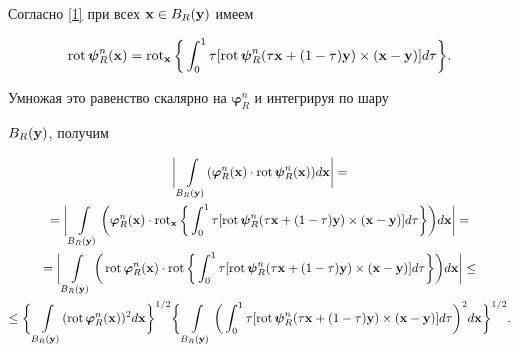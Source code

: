 \begin{pf}
Согласно \eqref{1} при всех $\bold{x}\in B_R(\bold{y})$ имеем


$$


\Rot\boldsymbol{\psi}_R^n(\bold{x})=\Rot_{\bold{x}}\bigg\{\int_0^1\tau[


\Rot\boldsymbol{\psi}_R^n(\tau\bold{x}+(1-\tau)\bold{y})


\times(\bold{x}-\bold{y})]d\tau\bigg\}.


$$


Умножая это равенство скалярно на $\boldsymbol{\varphi}_R^n$ и интегрируя по шару


$B_R(\bold{y})$, получим


\begin{gather*}


\bigg|\int\limits_{B_R(\bold{y})}(\boldsymbol{\varphi}_R^n(\bold{x})\cdot\Rot


\boldsymbol{\psi}_R^n(\bold{x}))d\bold{x}\bigg|= \\


%


=\bigg|\int\limits_{B_R(\bold{y})}\bigg(\boldsymbol


{\varphi}_R^n(\bold{x})\cdot\Rot_{\bold{x}}\bigg\{\int_0^1\tau[


\Rot\boldsymbol{\psi}_R^n(\tau\bold{x}+(1-\tau)\bold{y})\times(\bold{x}-\bold{y})]


d\tau\bigg\}\bigg)d\bold{x}\bigg|= \\


%


=\bigg|\int\limits_{B_R(\bold{y})}\bigg(\Rot\boldsymbol


{\varphi}_R^n(\bold{x})\cdot\Rot\bigg\{\int_0^1


\tau[\Rot\boldsymbol{\psi}_R^n(\tau\bold{x}+(1-\tau)\bold{y})\times


(\bold{x}-\bold{y})]d\tau\bigg\}\bigg)d\bold{x}\bigg|\leq \\


%


\leq\bigg\{\int\limits_{B_R(\bold{y})}(\Rot\boldsymbol


{\varphi}_R^n(\bold{x}))^2d\bold{x}\bigg\}^{1/2}


\bigg\{\int\limits_{B_R (\bold{y})}\bigg(\int_0^1


\tau[\Rot\boldsymbol{\psi}_R^n(\tau\bold{x}+(1-\tau)\bold{y})\times


(\bold{x}-\bold{y})]d\tau\bigg)^2d\bold{x}\bigg\}^{1/2}.


\end{gather*}






\end{pf}
